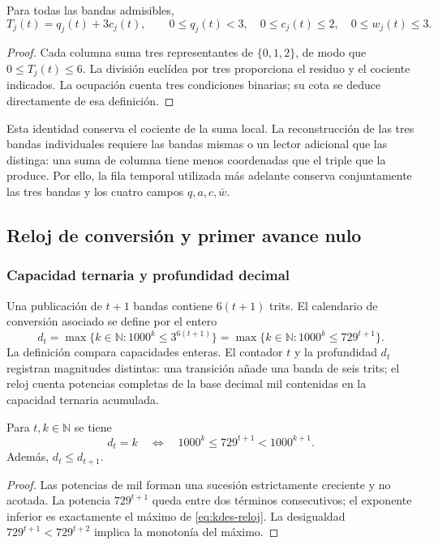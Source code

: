 \begin{proposition}
Para todas las bandas admisibles,
\[
 T_j(t)=q_j(t)+3c_j(t),\qquad
 0\leq q_j(t)<3,\quad 0\leq c_j(t)\leq2,
 \quad0\leq w_j(t)\leq3.
\]
\end{proposition}
\begin{proof}
Cada columna suma tres representantes de $\{0,1,2\}$, de modo que
$0\leq T_j(t)\leq6$. La división euclídea por tres proporciona el residuo
y el cociente indicados. La ocupación cuenta tres condiciones binarias;
su cota se deduce directamente de esa definición.
\end{proof}

Esta identidad conserva el cociente de la suma local. La reconstrucción
de las tres bandas individuales requiere las bandas mismas o un lector
adicional que las distinga: una suma de columna tiene menos coordenadas
que el triple que la produce. Por ello, la fila temporal utilizada más
adelante conserva conjuntamente las tres bandas y los cuatro campos
$q,a,c,\bar w$.

\subsection{Reloj de conversión y primer avance nulo}

\subsubsection{Capacidad ternaria y profundidad decimal}

Una publicación de $t+1$ bandas contiene $6(t+1)$ trits. El calendario
de conversión asociado se define por el entero
\begin{equation}
 d_t=\max\{k\in\mathbb N:1000^k\leq3^{6(t+1)}\}
     =\max\{k\in\mathbb N:1000^k\leq729^{t+1}\}.
 \label{eq:kdes-reloj}
\end{equation}
La definición compara capacidades enteras. El contador $t$ y la
profundidad $d_t$ registran magnitudes distintas: una transición añade
una banda de seis trits; el reloj cuenta potencias completas de la base
decimal mil contenidas en la capacidad ternaria acumulada.

\begin{lemma}
Para $t,k\in\mathbb N$ se tiene
\[
 d_t=k\quad\Longleftrightarrow\quad
 1000^k\leq729^{t+1}<1000^{k+1}.
\]
Además, $d_t\leq d_{t+1}$.
\end{lemma}
\begin{proof}
Las potencias de mil forman una sucesión estrictamente creciente y no
acotada. La potencia $729^{t+1}$ queda entre dos términos consecutivos;
el exponente inferior es exactamente el máximo de
\eqref{eq:kdes-reloj}. La desigualdad
$729^{t+1}<729^{t+2}$ implica la monotonía del máximo.
\end{proof}

